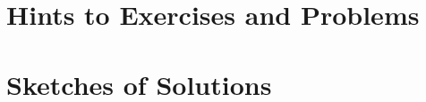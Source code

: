 \chapter{Hints to Exercises and Problems}\label{app:hints}
\begin{enumerate}
	
\end{enumerate}

\chapter{Sketches of Solutions}\label{app:sol}
\begin{enumerate}
	
\end{enumerate}
